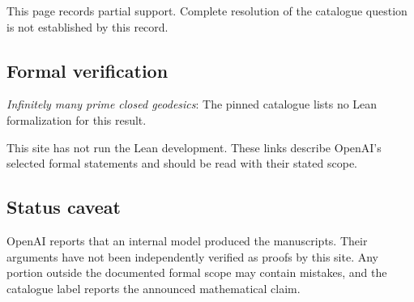 \documentclass[11pt]{article}
\begin{document}
This page records partial support. Complete resolution of the catalogue question is not established by this record.

\subsection{Formal verification}
\textit{Infinitely many prime closed geodesics}: The pinned catalogue lists no Lean formalization for this result.

This site has not run the Lean development. These links describe OpenAI’s selected formal statements and should be read with their stated scope.

\subsection{Status caveat}
OpenAI reports that an internal model produced the manuscripts. Their arguments have not been independently verified as proofs by this site. Any portion outside the documented formal scope may contain mistakes, and the catalogue label reports the announced mathematical claim.
\end{document}
